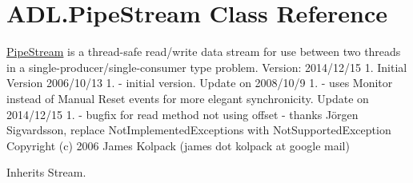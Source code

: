\hypertarget{class_a_d_l_1_1_pipe_stream}{}\section{A\+D\+L.\+Pipe\+Stream Class Reference}
\label{class_a_d_l_1_1_pipe_stream}


\mbox{\hyperlink{class_a_d_l_1_1_pipe_stream}{Pipe\+Stream}} is a thread-\/safe read/write data stream for use between two threads in a single-\/producer/single-\/consumer type problem. Version\+: 2014/12/15 1. Initial Version 2006/10/13 1. -\/ initial version. Update on 2008/10/9 1. -\/ uses Monitor instead of Manual Reset events for more elegant synchronicity. Update on 2014/12/15 1. -\/ bugfix for read method not using offset -\/ thanks Jörgen Sigvardsson, replace Not\+Implemented\+Exceptions with Not\+Supported\+Exception Copyright (c) 2006 James Kolpack (james dot kolpack at google mail)  




Inherits Stream.

